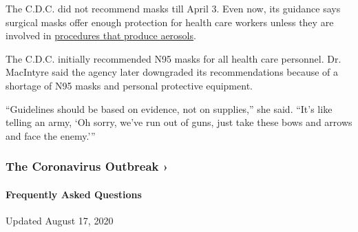 The C.D.C. did not recommend masks till April 3. Even now, its guidance
says surgical masks offer enough protection for health care workers
unless they are involved in
\href{https://www.cdc.gov/coronavirus/2019-ncov/hcp/guidance-risk-assesment-hcp.html}{procedures
that produce aerosols}.

The C.D.C. initially recommended N95 masks for all health care
personnel. Dr. MacIntyre said the agency later downgraded its
recommendations because of a shortage of N95 masks and personal
protective equipment.

``Guidelines should be based on evidence, not on supplies,'' she said.
``It's like telling an army, `Oh sorry, we've run out of guns, just take
these bows and arrows and face the enemy.'''

\href{https://www.nytimes3xbfgragh.onion/news-event/coronavirus?action=click\&pgtype=Article\&state=default\&region=MAIN_CONTENT_3\&context=storylines_faq}{}

\hypertarget{the-coronavirus-outbreak-}{%
\subsubsection{The Coronavirus Outbreak
›}\label{the-coronavirus-outbreak-}}

\hypertarget{frequently-asked-questions}{%
\paragraph{Frequently Asked
Questions}\label{frequently-asked-questions}}

Updated August 17, 2020

